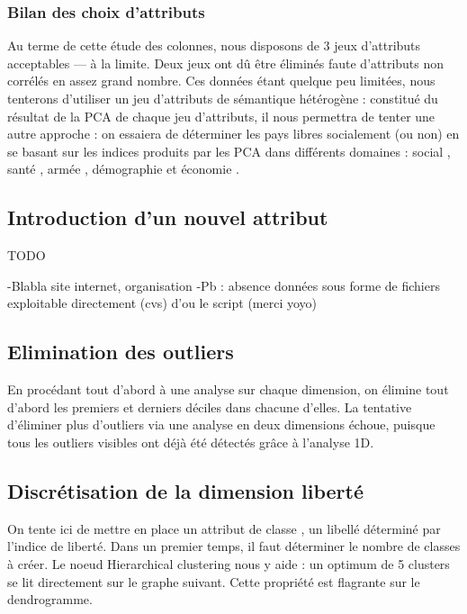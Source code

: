 \subsubsection{Bilan des choix d'attributs}
Au terme de cette étude des colonnes, nous disposons de 3 jeux d'attributs acceptables --- à la limite. Deux jeux ont dû être éliminés faute d'attributs non corrélés en assez grand nombre. Ces données étant quelque peu limitées, nous tenterons d'utiliser un jeu d'attributs de sémantique hétérogène : constitué du résultat de la PCA de chaque jeu d'attributs, il nous permettra de tenter une autre approche : on essaiera de déterminer les pays libres socialement (ou non) en se basant sur les indices produits par les PCA dans différents domaines : \og social \fg, \og santé \fg, \og armée \fg, \og démographie \fg et \og économie \fg.


\subsection{Introduction d'un nouvel attribut}

{\huge TODO}

-Blabla site internet, organisation
-Pb : absence données sous forme de fichiers exploitable directement (cvs) d'ou le script (merci yoyo)

\subsection{Elimination des outliers}
En procédant tout d'abord à une analyse sur chaque dimension, on élimine tout d'abord les premiers et derniers déciles dans chacune d'elles.
La tentative d'éliminer plus d'outliers via une analyse en deux dimensions échoue, puisque tous les outliers visibles ont déjà été détectés grâce à l'analyse 1D.

\subsection{Discrétisation de la dimension \og liberté \fg}
On tente ici de mettre en place un attribut de \og classe \fg, un libellé déterminé par l'indice de liberté. Dans un premier temps, il faut déterminer le nombre de classes à créer. Le noeud \og Hierarchical clustering \fg nous y aide : un optimum de 5 clusters se lit directement sur le graphe suivant.
Cette propriété est flagrante sur le dendrogramme.

